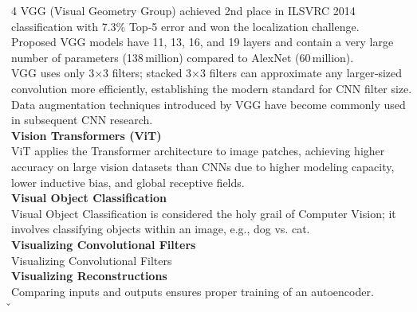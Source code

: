 \documentclass[8pt]{extarticle}
\begin{document}
\begin{multicols}{4}
VGG (Visual Geometry Group) achieved 2nd place in ILSVRC 2014 classification with 7.3\% Top‑5 error and won the localization challenge.\\
Proposed VGG models have 11, 13, 16, and 19 layers and contain a very large number of parameters (138 million) compared to AlexNet (60 million).\\
VGG uses only 3×3 filters; stacked 3×3 filters can approximate any larger‑sized convolution more efficiently, establishing the modern standard for CNN filter size.\\
Data augmentation techniques introduced by VGG have become commonly used in subsequent CNN research.\\
\vspace{2pt}\textbf{Vision Transformers (ViT)}\\
ViT applies the Transformer architecture to image patches, achieving higher accuracy on large vision datasets than CNNs due to higher modeling capacity, lower inductive bias, and global receptive fields.\\
\vspace{2pt}\textbf{Visual Object Classification}\\
Visual Object Classification is considered the holy grail of Computer Vision; it involves classifying objects within an image, e.g., dog vs. cat.\\
\vspace{2pt}\textbf{Visualizing Convolutional Filters}\\
Visualizing Convolutional Filters\\
\vspace{2pt}\textbf{Visualizing Reconstructions}\\
Comparing inputs and outputs ensures proper training of an autoencoder.\\
\v


\end{multicols}
\end{document}
